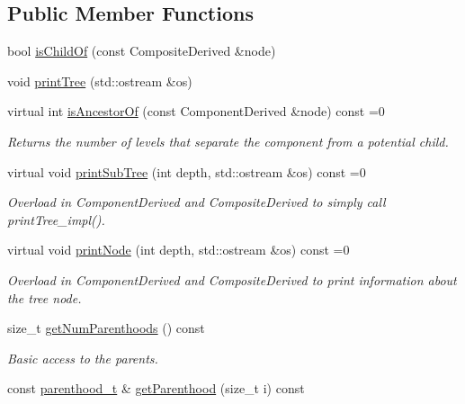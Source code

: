 \subsection*{Public Member Functions}
\begin{DoxyCompactItemize}
\item 
bool \hyperlink{classocra_1_1Component_a77448d773b20fda6d8349d20691a8840}{is\+Child\+Of} (const Composite\+Derived \&node)
\item 
void \hyperlink{classocra_1_1Component_a9bc74f9a471df60ee9b1d49e7f55e04f}{print\+Tree} (std\+::ostream \&os)
\item 
virtual int \hyperlink{classocra_1_1Component_a8a0e052f36c60889562e921751b02a37}{is\+Ancestor\+Of} (const Component\+Derived \&node) const =0
\begin{DoxyCompactList}\small\item\em Returns the number of levels that separate the component from a potential child. \end{DoxyCompactList}\item 
virtual void \hyperlink{classocra_1_1Component_a3687a02c1524694fc616893264ca8199}{print\+Sub\+Tree} (int depth, std\+::ostream \&os) const =0
\begin{DoxyCompactList}\small\item\em Overload in Component\+Derived and Composite\+Derived to simply call print\+Tree\+\_\+impl(). \end{DoxyCompactList}\item 
virtual void \hyperlink{classocra_1_1Component_a61bb6d9557a6ba3d13f9bc083422d1a7}{print\+Node} (int depth, std\+::ostream \&os) const =0
\begin{DoxyCompactList}\small\item\em Overload in Component\+Derived and Composite\+Derived to print information about the tree node. \end{DoxyCompactList}\end{DoxyCompactItemize}
{\bf }\par
\begin{DoxyCompactItemize}
\item 
size\+\_\+t \hyperlink{classocra_1_1Component_a94ccee58097cb344e97b02e764eb11ae}{get\+Num\+Parenthoods} () const 
\begin{DoxyCompactList}\small\item\em Basic access to the parents. \end{DoxyCompactList}\item 
const \hyperlink{classocra_1_1Component_a70fb7cda78934a9f017c7e46c1407953}{parenthood\+\_\+t} \& \hyperlink{classocra_1_1Component_a88e8d94dc8106958d0e2ae468579e4d3}{get\+Parenthood} (size\+\_\+t i) const 
\end{DoxyCompactItemize}

